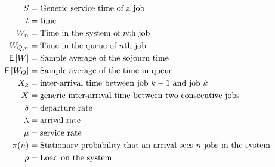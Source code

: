 \begin{align*}
  S &= \text{Generic service time of a job} \\
  t &= \text{time} \\
  W_n &= \text{Time in the system of $n$th job} \\
  W_{Q,n} &= \text{Time in the queue of $n$th job} \\
  \,\mathsf{E}\left[W\right] &= \text{Sample average of the sojourn time} \\
  \,\mathsf{E}\left[W_Q\right] &= \text{Sample average of the time in queue} \\
  X_k &= \text{inter-arrival time between job $k-1$ and job  $k$} \\
  X &= \text{generic inter-arrival time between two consecutive jobs} \\
  \delta &= \text{departure rate} \\
  \lambda &= \text{arrival rate} \\
  \mu &= \text{service rate} \\
  \pi(n)  &= \text{Stationary probability that an arrival sees $n$ jobs in the system} \\
  \rho &= \text{Load on the system} \\
\end{align*}

